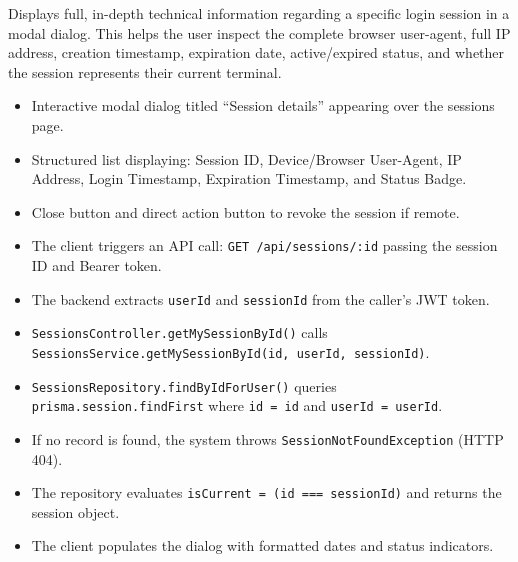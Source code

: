 \noindent Displays full, in-depth technical information regarding a specific login session in a modal dialog. This helps the user inspect the complete browser user-agent, full IP address, creation timestamp, expiration date, active/expired status, and whether the session represents their current terminal.

\begin{itemize}[leftmargin=1.6em,topsep=3pt,itemsep=2pt,parsep=0pt,label=$\bullet$]
    \item Interactive modal dialog titled ``Session details'' appearing over the sessions page.
    \item Structured list displaying: Session ID, Device/Browser User-Agent, IP Address, Login Timestamp, Expiration Timestamp, and Status Badge.
    \item Close button and direct action button to revoke the session if remote.
\end{itemize}

\begin{itemize}[leftmargin=1.6em,topsep=3pt,itemsep=2pt,parsep=0pt,label=$\bullet$]
    \item The client triggers an API call: \texttt{GET /api/sessions/:id} passing the session ID and Bearer token.
    \item The backend extracts \texttt{userId} and \texttt{sessionId} from the caller's JWT token.
    \item \texttt{Sessions\allowbreak{}Controller.\allowbreak{}get\allowbreak{}My\allowbreak{}Session\allowbreak{}By\allowbreak{}Id()} calls \texttt{Sessions\allowbreak{}Service.\allowbreak{}get\allowbreak{}My\allowbreak{}Session\allowbreak{}By\allowbreak{}Id(\allowbreak{}id, userId, sessionId)}.
    \item \texttt{Sessions\allowbreak{}Repository.\allowbreak{}find\allowbreak{}By\allowbreak{}Id\allowbreak{}For\allowbreak{}User()} queries \texttt{prisma.\allowbreak{}session.\allowbreak{}findFirst} where \texttt{id = id} and \texttt{userId = userId}.
    \item If no record is found, the system throws \texttt{Session\allowbreak{}Not\allowbreak{}Found\allowbreak{}Exception} (HTTP 404).
    \item The repository evaluates \texttt{isCurrent = (id === sessionId)} and returns the session object.
    \item The client populates the dialog with formatted dates and status indicators.
\end{itemize}

